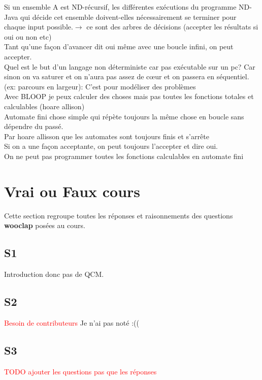 \documentclass{report}
\begin{document}
Si un ensemble A est ND-récursif, les différentes exécutions du programme ND-Java qui décide cet ensemble doivent-elles nécessairement se terminer pour chaque input possible.$\rightarrow$ ce sont des arbres de décisions (accepter les résultats si oui ou non etc)\\

Tant qu'une façon d'avancer dit oui même avec une boucle infini, on peut accepter.\\
Quel est le but d'un langage non déterministe car pas exécutable sur un pc? Car sinon on va saturer et on n'aura pas assez de cœur et on passera en séquentiel. (ex: parcours en largeur): C'est pour modéliser des problèmes\\

Avec BLOOP je peux calculer des choses mais pas toutes les fonctions totales et calculables (hoare allison)\\

Automate fini chose simple qui répète toujours la même chose en boucle sans dépendre du passé.\\

Par hoare allisson que les automates sont toujours finis et s'arrête\\

Si on a une façon acceptante, on peut toujours l'accepter et dire oui.\\

On ne peut pas programmer toutes les fonctions calculables en automate fini

\chapter{Vrai ou Faux cours} %
Cette section regroupe toutes les réponses et raisonnements des questions \textbf{wooclap} posées au cours.

\section{S1}
Introduction donc pas de QCM.

\section{S2}
\textcolor{red}{Besoin de contributeurs}
Je n'ai pas noté :(( 

\section{S3}
\textcolor{red}{TODO ajouter les questions pas que les réponses}
\end{document}

